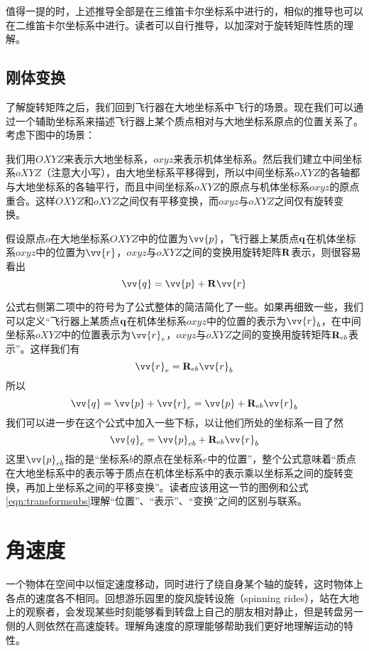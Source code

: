 \documentclass[11pt]{article}
\begin{document}
值得一提的时，上述推导全部是在三维笛卡尔坐标系中进行的，相似的推导也可以在二维笛卡尔坐标系中进行。读者可以自行推导，以加深对于旋转矩阵性质的理解。

\subsection{刚体变换}\label{sec:transform}
了解旋转矩阵之后，我们回到飞行器在大地坐标系中飞行的场景。现在我们可以通过一个辅助坐标系来描述飞行器上某个质点相对与大地坐标系原点的位置关系了。考虑下图中的场景：

我们用$OXYZ$来表示大地坐标系，$oxyz$来表示机体坐标系。然后我们建立中间坐标系$oXYZ$（注意大小写），由大地坐标系平移得到，所以中间坐标系$oXYZ$的各轴都与大地坐标系的各轴平行，而且中间坐标系$oXYZ$的原点与机体坐标系$oxyz$的原点重合。这样$OXYZ$和$oXYZ$之间仅有平移变换，而$oxyz$与$oXYZ$之间仅有旋转变换。

假设原点$o$在大地坐标系$OXYZ$中的位置为$\vv{p}$，飞行器上某质点$\bf{q}$在机体坐标系$oxyz$中的位置为$\vv{r}$，$oxyz$与$oXYZ$之间的变换用旋转矩阵${\bf R}$表示，则很容易看出
\begin{equation}\label{eqn:transform}
\vv{q} = \vv{p} + {\bf R}\vv{r}
\end{equation}

公式右侧第二项中的符号为了公式整体的简洁简化了一些。如果再细致一些，我们可以定义“飞行器上某质点$\bf{q}$在机体坐标系$oxyz$中的位置的表示为$\vv{r}_b$，在中间坐标系$oXYZ$中的位置表示为$\vv{r}_e$，$oxyz$与$oXYZ$之间的变换用旋转矩阵${\bf R}_{eb}$表示”。这样我们有
$$
\vv{r}_e = {\bf R}_{eb}\vv{r}_b
$$
所以
$$
\vv{q} = \vv{p} + \vv{r}_e = \vv{p} + {\bf R}_{eb}\vv{r}_b
$$
我们可以进一步在这个公式中加入一些下标，以让他们所处的坐标系一目了然
\begin{equation}\label{eqn:transformsubs}
\vv{q}_{e} = \vv{p}_{eb} + {\bf R}_{eb}\vv{r}_b
\end{equation}
这里$\vv{p}_{eb}$指的是“坐标系$b$的原点在坐标系$e$中的位置”，整个公式意味着“质点在大地坐标系中的表示等于质点在机体坐标系中的表示乘以坐标系之间的旋转变换，再加上坐标系之间的平移变换”。读者应该用这一节的图例和公式\ref{eqn:transformsubs}理解“位置”、“表示”、“变换”之间的区别与联系。


\section{角速度}\label{sec:angular}
一个物体在空间中以恒定速度移动，同时进行了绕自身某个轴的旋转，这时物体上各点的速度各不相同。回想游乐园里的旋风旋转设施（spinning rides），站在大地上的观察者，会发现某些时刻能够看到转盘上自己的朋友相对静止，但是转盘另一侧的人则依然在高速旋转。理解角速度的原理能够帮助我们更好地理解运动的特性。
\end{document}
